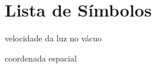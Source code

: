 \chapter*{Lista de Símbolos}
\thispagestyle{empty}

\begin{description}[labelwidth=1cm]
\item[$c_0$] velocidade da luz no vácuo
\item[$x$] coordenada espacial
\end{description}

